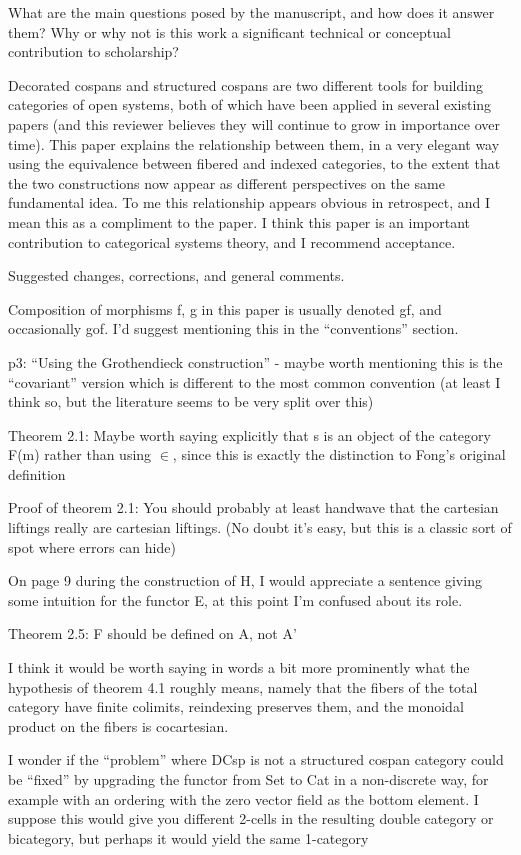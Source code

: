 \documentclass[reqno]{amsart}
\begin{document}
{\footnotesize
What are the main questions posed by the manuscript, and how does it answer them? Why or why not is this work a significant technical or conceptual 
contribution to scholarship?

Decorated cospans and structured cospans are two different tools for building categories of open systems, both of which have been applied in several 
existing papers (and this reviewer believes they will continue to grow in importance over time). This paper explains the relationship between them, in 
a very elegant way using the equivalence between fibered and indexed categories, to the extent that the two constructions now appear as different 
perspectives on the same fundamental idea. To me this relationship appears obvious in retrospect, and I mean this as a compliment to the paper. I 
think this paper is an important contribution to categorical systems theory, and I recommend acceptance.

Suggested changes, corrections, and general comments.

Composition of morphisms f, g in this paper is usually denoted gf, and occasionally gof. I’d suggest mentioning this in the “conventions” section.

p3: “Using the Grothendieck construction” - maybe worth mentioning this is the “covariant” version which is different to the most common convention 
(at least I think so, but the literature seems to be very split over this)

Theorem 2.1: Maybe worth saying explicitly that s is an object of the category F(m) rather than using $\in$, since this is exactly the distinction to 
Fong’s original definition

Proof of theorem 2.1: You should probably at least handwave that the cartesian liftings really are cartesian liftings. (No doubt it’s easy, but this 
is a classic sort of spot where errors can hide)

On page 9 during the construction of H, I would appreciate a sentence giving some intuition for the functor E, at this point I’m confused about its 
role.

Theorem 2.5: F should be defined on A, not A’

I think it would be worth saying in words a bit more prominently what the hypothesis of theorem 4.1 roughly means, namely that the fibers of the total 
category have finite colimits, reindexing preserves them, and the monoidal product on the fibers is cocartesian.

I wonder if the “problem” where DCsp is not a structured cospan category could be “fixed” by upgrading the functor from Set to Cat in a non-discrete 
way, for example with an ordering with the zero vector field as the bottom element. I suppose this would give you different 2-cells in the resulting 
double category or bicategory, but perhaps it would yield the same 1-category}
\end{document}
